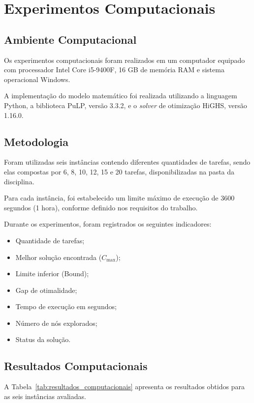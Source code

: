 \documentclass[11pt,a4paper]{article}
\begin{document}
\section{Experimentos Computacionais}
\label{sec:experimentos}

\subsection{Ambiente Computacional}
Os experimentos computacionais foram realizados em um computador equipado com processador Intel Core i5-9400F, 16 GB de memória RAM e sistema operacional Windows.

A implementação do modelo matemático foi realizada utilizando a linguagem Python, a biblioteca PuLP, versão 3.3.2, e o \textit{solver} de otimização HiGHS, versão 1.16.0.

\subsection{Metodologia}
Foram utilizadas seis instâncias contendo diferentes quantidades de tarefas, sendo elas compostas por 6, 8, 10, 12, 15 e 20 tarefas, disponibilizadas na pasta da disciplina.

Para cada instância, foi estabelecido um limite máximo de execução de 3600 segundos (1 hora), conforme definido nos requisitos do trabalho.

Durante os experimentos, foram registrados os seguintes indicadores:
\begin{itemize}
    \item Quantidade de tarefas;
    \item Melhor solução encontrada ($C_{\max}$);
    \item Limite inferior (Bound);
    \item Gap de otimalidade;
    \item Tempo de execução em segundos;
    \item Número de nós explorados;
    \item Status da solução.
\end{itemize}

\subsection{Resultados Computacionais}
A Tabela~\ref{tab:resultados_computacionais} apresenta os resultados obtidos para as seis instâncias avaliadas.
\end{document}
